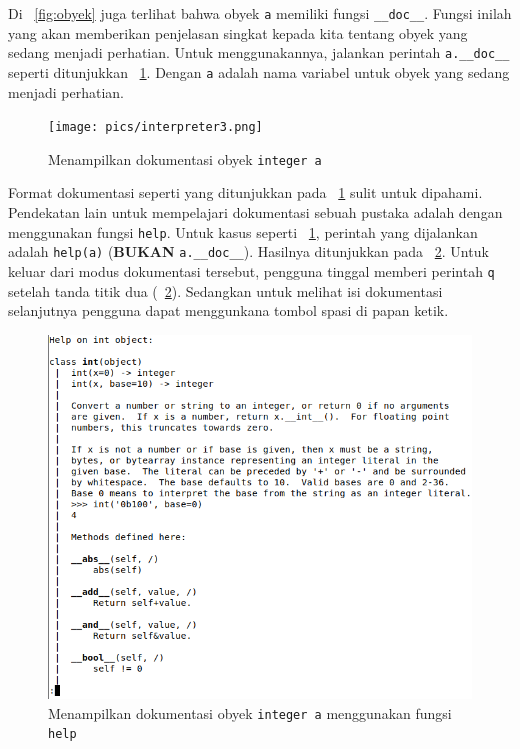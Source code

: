 Di \figurename~\ref{fig:obyek} juga terlihat bahwa obyek \texttt{a} memiliki fungsi \texttt{\_\_doc\_\_}. Fungsi inilah yang akan memberikan penjelasan singkat kepada kita tentang obyek yang sedang menjadi perhatian. Untuk menggunakannya, jalankan perintah \texttt{a.\_\_doc\_\_} seperti ditunjukkan \figurename~\ref{fig:doc}. Dengan \texttt{a} adalah nama variabel untuk obyek yang sedang menjadi perhatian.

\begin{figure}[h!]
  \begin{center}
    \texttt{[image: pics/interpreter3.png]}
    \caption{Menampilkan dokumentasi obyek \texttt{integer a}}
    \label{fig:doc}
  \end{center}
\end{figure}

Format dokumentasi seperti yang ditunjukkan pada \figurename~\ref{fig:doc} sulit untuk dipahami. Pendekatan lain untuk mempelajari dokumentasi sebuah pustaka adalah dengan menggunakan fungsi \texttt{help}. Untuk kasus seperti \figurename~\ref{fig:doc}, perintah yang dijalankan adalah \texttt{help(a)} (\textbf{BUKAN} \texttt{a.\_\_doc\_\_}). Hasilnya ditunjukkan pada \figurename~\ref{fig:doc2}. Untuk keluar dari modus dokumentasi tersebut, pengguna tinggal memberi perintah \texttt{q} setelah tanda titik dua (\figurename~\ref{fig:doc2}). Sedangkan untuk melihat isi dokumentasi selanjutnya pengguna dapat menggunkana tombol spasi di papan ketik.

\begin{figure}
  \begin{center}
    \includegraphics[scale=.5]{pics/interpreter4.png}
    \caption{Menampilkan dokumentasi obyek \texttt{integer a} menggunakan fungsi \texttt{help}}
    \label{fig:doc2}
  \end{center}
\end{figure}

